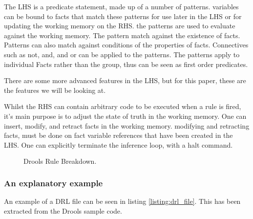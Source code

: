 The LHS is a predicate statement, made up of a number of patterns.
variables can be bound to facts that match these patterns for use later in the LHS or for updating the working memory on the RHS.
the patterns are used to evaluate against the working memory.
The pattern match against the existence of facts.
Patterns can also match against conditions of the properties of facts.
Connectives such as not, and, and or can be applied to the patterns.
The patterns apply to individual Facts rather than the group, thus can be seen as first order predicates.

There are some more advanced features in the LHS, but for this paper, these are the features we will be looking at.

Whilst the RHS can contain arbitrary code to be executed when a rule is fired, it's main purpose is to adjust the state of truth in the working memory.
One can insert, modify, and retract facts in the working memory.
modifying and retracting facts, must be done on fact variable references that have been created in the LHS.
One can explicitly terminate the inference loop, with a halt command.

\begin{figure}[h]
    \centering
    \caption{Drools Rule Breakdown.}
    \label{fig:Drools_Rule_Breakdown}
\end{figure}


\subsubsection{An explanatory example}
An example of a DRL file can be seen in listing \ref{listing:drl_file}.
This has been extracted from the Drools sample code.


